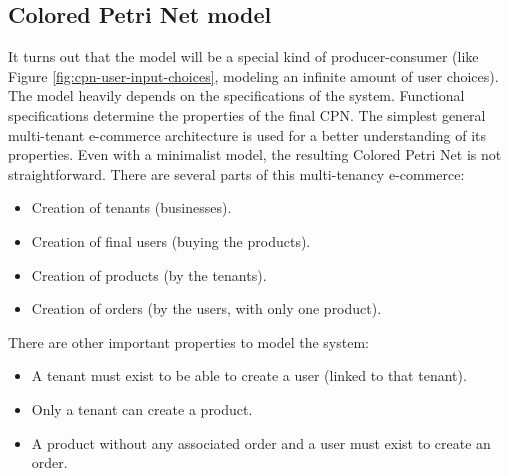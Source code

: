 \documentclass[12pt,english]{article} %
\begin{document}

\subsection{Colored Petri Net model}
It turns out that the model will be a special kind of producer-consumer (like Figure  \ref{fig:cpn-user-input-choices}, modeling an infinite amount of user choices).
The model heavily depends on the specifications of the system.
Functional specifications determine the properties of the final CPN.
The simplest general multi-tenant e-commerce architecture is used for a better understanding of its properties.
Even with a minimalist model, the resulting Colored Petri Net is not straightforward.
There are several parts of this multi-tenancy e-commerce:
\begin{itemize}
    \item Creation of tenants (businesses).
    \item Creation of final users (buying the products).
    \item Creation of products (by the tenants).
    \item Creation of orders (by the users, with only one product).
\end{itemize}

There are other important properties to model the system:
\begin{itemize}
    \item A tenant must exist to be able to create a user (linked to that tenant).
    \item Only a tenant can create a product.
    \item A product without any associated order and a user must exist to create an order.
\end{itemize}
\end{document}
